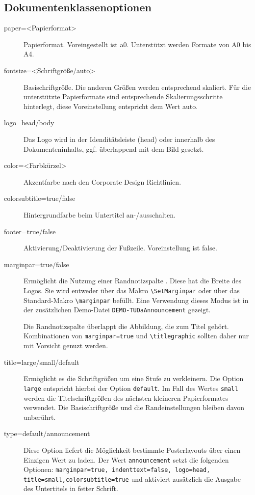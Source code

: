 \documentclass[
	paper=a0,
	german,
	accentcolor=9c,
	logo=body,%
	footer=true,
	]{tudaposter}
\let\file\texttt
\let\code\texttt
\let\tbs\textbackslash
\begin{document}
\begin{multicols}{2}
\subsection*{Dokumentenklassenoptionen}
\begin{description}
	\item[paper=<Papierformat>] Papierformat. Voreingestellt ist a0. Unterstützt werden Formate von A0 bis A4.
	\item[fontsize=<Schriftgröße/auto>] Basischriftgröße. Die anderen Größen werden entsprechend skaliert. Für die unterstützte Papierformate sind entsprechende Skalierungsschritte hinterlegt, diese Voreinstellung entspricht dem Wert auto.
	\item[logo=head/body] Das Logo wird in der Idenditätsleiste (head) oder innerhalb des Dokumenteninhalts, ggf. überlappend mit dem Bild gesetzt.
	\item[color=<Farbkürzel>] Akzentfarbe nach den Corporate Design Richtlinien.
	\item[colorsubtitle=true/false] Hintergrundfarbe beim Untertitel an-/ausschalten.
	\item[footer=true/false] Aktivierung/Deaktivierung der Fußzeile. Voreinstellung ist false.
	\item[marginpar=true/false] Ermöglicht die Nutzung einer Randnotizspalte . Diese hat die Breite des Logos. Sie wird entweder über das Makro \code{\tbs{}SetMarginpar} oder über das Standard-Makro \code{\tbs{}marginpar} befüllt. Eine Verwendung dieses Modus ist in der zusätzlichen Demo-Datei \file{DEMO-TUDaAnnouncement} gezeigt.

	Die Randnotizspalte überlappt die Abbildung, die zum Titel gehört. Kombinationen von \code{marginpar=true} und \code{\tbs{}titlegraphic} sollten daher nur mit Vorsicht genuzt werden.

	\item[title=large/small/default] Ermöglicht es die Schriftgrößen um eine Stufe zu verkleinern. Die Option \code{large} entspricht hierbei der Option \code{default}. Im Fall des Wertes \code{small} werden die Titelschriftgrößen des nächsten kleineren Papierformates verwendet. Die Basischriftgröße und die Randeinstellungen bleiben davon unberührt.
	\item[type=default/announcement] Diese Option liefert die Möglichkeit bestimmte Posterlayouts über einen Einzigen Wert zu laden.
	Der Wert \code{announcement} setzt die folgenden Optionen: \code{marginpar=true, indenttext=false, logo=head, title=small,colorsubtitle=true} und aktiviert zusätzlich die Ausgabe des Untertitels in fetter Schrift.
\end{description}
\end{multicols}
\end{document}
